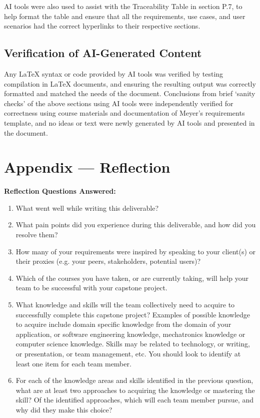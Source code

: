 \documentclass{scrreprt}
\newcommand*{\nsection}[1]{
	\section*{#1}
	\addcontentsline{toc}{section}{#1}
}
\theoremstyle{definition}
\begin{document}
	AI tools were also used to assist with the Traceability Table in section P.7, to help 
	format the table and ensure that all the requirements, use cases, and user scenarios had the correct hyperlinks 
	to their respective sections. 
	
	\subsection*{Verification of AI-Generated Content}
	
	Any LaTeX syntax or code provided by AI tools was verified by testing 
	compilation in LaTeX documents, and ensuring the resulting output was 
	correctly formatted and matched the needs of the document. Conclusions from 
	brief `sanity checks' of the above sections using AI tools were 
	independently verified for correctness using course materials and 
	documentation of Meyer's requirements template, and no ideas or text were 
	newly generated by AI tools and presented in the document.
	
	\newpage{}
	
	\nsection{Appendix --- Reflection}
	
	\textbf{Reflection Questions Answered:}
	
	\begin{enumerate}
		\item What went well while writing this deliverable? 
		\item What pain points did you experience during this deliverable, and 
		how did
		you resolve them?
		\item How many of your requirements were inspired by speaking to your
		client(s) or their proxies (e.g. your peers, stakeholders, potential 
		users)?
		\item Which of the courses you have taken, or are currently taking, 
		will help
		your team to be successful with your capstone project.
		\item What knowledge and skills will the team collectively need to 
		acquire to
		successfully complete this capstone project?  Examples of possible 
		knowledge
		to acquire include domain specific knowledge from the domain of your
		application, or software engineering knowledge, mechatronics knowledge 
		or
		computer science knowledge.  Skills may be related to technology, or 
		writing,
		or presentation, or team management, etc.  You should look to identify 
		at
		least one item for each team member.
		\item For each of the knowledge areas and skills identified in the 
		previous
		question, what are at least two approaches to acquiring the knowledge or
		mastering the skill?  Of the identified approaches, which will each team
		member pursue, and why did they make this choice?
	\end{enumerate}
	
\end{document}
